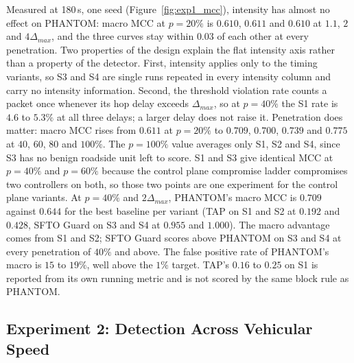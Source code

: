 \documentclass[final,5p,twocolumn]{elsarticle}
\theoremstyle{remark}
\theoremstyle{plain}
\begin{document}
Measured at 180\,s, one seed (Figure~\ref{fig:exp1_mcc}), intensity has almost
no effect on PHANTOM: macro MCC at $p{=}20\%$ is $0.610$, $0.611$ and $0.610$ at
$1.1$, $2$ and $4\Delta_{max}$, and the three curves stay within $0.03$ of each other at every
penetration. Two properties of the design explain the flat intensity axis rather than a
property of the detector. First, intensity applies only to the timing variants, so S3 and S4
are single runs repeated in every intensity column and carry no intensity information.
Second, the threshold violation rate counts a packet once whenever its hop delay exceeds
$\Delta_{max}$, so at $p{=}40\%$ the S1 rate is $4.6$ to $5.3\%$ at all three delays; a
larger delay does not raise it. Penetration does matter: macro MCC rises from $0.611$ at
$p{=}20\%$ to $0.709$, $0.700$, $0.739$ and $0.775$ at $40$, $60$, $80$ and $100\%$. The
$p{=}100\%$ value averages only S1, S2 and S4, since S3 has no benign roadside unit left to
score. S1 and S3 give identical MCC at $p{=}40\%$ and $p{=}60\%$ because the control plane
compromise ladder compromises two controllers on both, so those two points are one experiment
for the control plane variants. At $p{=}40\%$ and $2\Delta_{max}$, PHANTOM's macro MCC is $0.709$
against $0.644$ for the best baseline per variant (TAP on S1 and S2 at $0.192$ and $0.428$, SFTO Guard
on S3 and S4 at $0.955$ and $1.000$). The macro advantage comes from S1 and S2; SFTO Guard
scores above PHANTOM on S3 and S4 at every penetration of $40\%$ and above. The false positive rate of
PHANTOM's macro is $15$ to $19\%$, well above the $1\%$ target. TAP's $0.16$ to $0.25$ on S1 is
reported from its own running metric and is not scored by the same block rule as PHANTOM.

\subsection{Experiment 2: Detection Across Vehicular Speed}
\label{sec:exp2}
\end{document}
